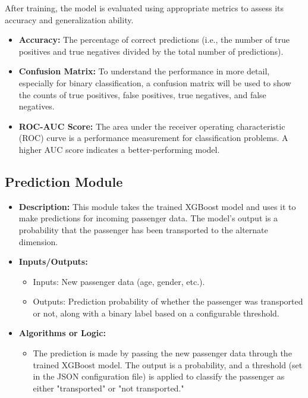 \documentclass[15pt]{article}
\begin{document}
After training, the model is evaluated using appropriate metrics to assess its accuracy and generalization ability.

\begin{itemize}
    \item \textbf{Accuracy:} The percentage of correct predictions (i.e., the number of true positives and true negatives divided by the total number of predictions).
    \item \textbf{Confusion Matrix:} To understand the performance in more detail, especially for binary classification, a confusion matrix will be used to show the counts of true positives, false positives, true negatives, and false negatives.
    \item \textbf{ROC-AUC Score:} The area under the receiver operating characteristic (ROC) curve is a performance measurement for classification problems. A higher AUC score indicates a better-performing model.
\end{itemize}

\subsection{Prediction Module}

\begin{itemize}
    \item \textbf{Description:} This module takes the trained XGBoost model and uses it to make predictions for incoming passenger data. The model's output is a probability that the passenger has been transported to the alternate dimension.
    \item \textbf{Inputs/Outputs:} 
    \begin{itemize}
        \item Inputs: New passenger data (age, gender, etc.).
        \item Outputs: Prediction probability of whether the passenger was transported or not, along with a binary label based on a configurable threshold.
    \end{itemize}
    \item \textbf{Algorithms or Logic:} 
    \begin{itemize}
        \item The prediction is made by passing the new passenger data through the trained XGBoost model. The output is a probability, and a threshold (set in the JSON configuration file) is applied to classify the passenger as either "transported" or "not transported."
    \end{itemize}
\end{itemize}
\end{document}

